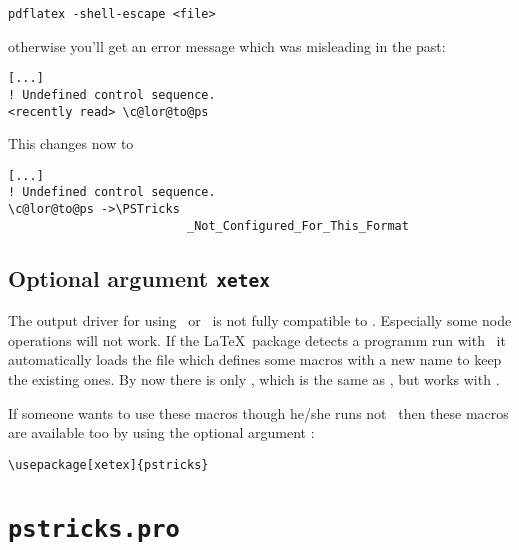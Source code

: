 \documentclass[11pt,english,BCOR=10mm,DIV=12,bibliography=totoc,parskip=false,headings=small,
    headinclude=false,footinclude=false,twoside]{pst-doc}
\let\Lfile\LFile
\begin{document}
\begin{verbatim}
pdflatex -shell-escape <file>
\end{verbatim}

otherwise you'll get an error message which was misleading in the past:

\begin{verbatim}
[...]
! Undefined control sequence.
<recently read> \c@lor@to@ps 
\end{verbatim}

This changes now to 


\begin{verbatim}
[...]
! Undefined control sequence.
\c@lor@to@ps ->\PSTricks 
                         _Not_Configured_For_This_Format
\end{verbatim}


\subsection{Optional argument \texttt{xetex}}
The output driver  for using \XeTeX\  or  \XeLaTeX\ is not fully
compatible to . Especially some node operations will not work. If the
\LaTeX\  package detects a programm run with \XeLaTeX\ it automatically loads the file
\Lfile{pstricks-xetex.def} which defines some macros with a new name to keep the existing
ones. By now there is only
, which is the same as , but works with \XeLaTeX.

If someone wants to use these macros though he/she runs not \XeLaTeX\ then these macros are
available too by using the optional argument :

\begin{verbatim}
\usepackage[xetex]{pstricks}
\end{verbatim}






\section{\texttt{pstricks.pro}}



\clearpage
\nocite{*}
\printbibliography

\printindex
\end{document}
